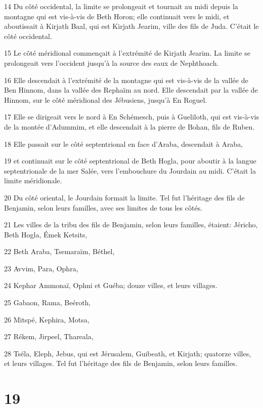 \par 14 Du côté occidental, la limite se prolongeait et tournait au midi depuis la montagne qui est vis-à-vis de Beth Horon; elle continuait vers le midi, et aboutissait à Kirjath Baal, qui est Kirjath Jearim, ville des fils de Juda. C'était le côté occidental.
\par 15 Le côté méridional commençait à l'extrémité de Kirjath Jearim. La limite se prolongeait vers l'occident jusqu'à la source des eaux de Nephthoach.
\par 16 Elle descendait à l'extrémité de la montagne qui est vis-à-vis de la vallée de Ben Hinnom, dans la vallée des Rephaïm au nord. Elle descendait par la vallée de Hinnom, sur le côté méridional des Jébusiens, jusqu'à En Roguel.
\par 17 Elle se dirigeait vers le nord à En Schémesch, puis à Gueliloth, qui est vis-à-vis de la montée d'Adummim, et elle descendait à la pierre de Bohan, fils de Ruben.
\par 18 Elle passait sur le côté septentrional en face d'Araba, descendait à Araba,
\par 19 et continuait sur le côté septentrional de Beth Hogla, pour aboutir à la langue septentrionale de la mer Salée, vers l'embouchure du Jourdain au midi. C'était la limite méridionale.
\par 20 Du côté oriental, le Jourdain formait la limite. Tel fut l'héritage des fils de Benjamin, selon leurs familles, avec ses limites de tous les côtés.
\par 21 Les villes de la tribu des fils de Benjamin, selon leurs familles, étaient: Jéricho, Beth Hogla, Émek Ketsits,
\par 22 Beth Araba, Tsemaraïm, Béthel,
\par 23 Avvim, Para, Ophra,
\par 24 Kephar Ammonaï, Ophni et Guéba; douze villes, et leurs villages.
\par 25 Gabaon, Rama, Beéroth,
\par 26 Mitspé, Kephira, Motsa,
\par 27 Rékem, Jirpeel, Thareala,
\par 28 Tséla, Eleph, Jebus, qui est Jérusalem, Guibeath, et Kirjath; quatorze villes, et leurs villages. Tel fut l'héritage des fils de Benjamin, selon leurs familles.

\chapter{19}

